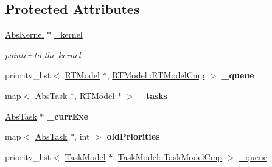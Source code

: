 \subsection*{Protected Attributes}
\begin{DoxyCompactItemize}
\item 
\hyperlink{classRTSim_1_1AbsKernel}{Abs\+Kernel} $\ast$ \hyperlink{classRTSim_1_1Scheduler_aa3fbe5bd5ca71cd567df02e6a8bfef5f}{\+\_\+kernel}\hypertarget{classRTSim_1_1Scheduler_aa3fbe5bd5ca71cd567df02e6a8bfef5f}{}\label{classRTSim_1_1Scheduler_aa3fbe5bd5ca71cd567df02e6a8bfef5f}

\begin{DoxyCompactList}\small\item\em pointer to the kernel \end{DoxyCompactList}\item 
priority\+\_\+list$<$ \hyperlink{classRTSim_1_1RTModel}{R\+T\+Model} $\ast$, \hyperlink{classRTSim_1_1RTModel_1_1RTModelCmp}{R\+T\+Model\+::\+R\+T\+Model\+Cmp} $>$ {\bfseries \+\_\+queue}\hypertarget{classRTSim_1_1Scheduler_a1cd9c1fe74eaa31e56b6f017a0e1e44d}{}\label{classRTSim_1_1Scheduler_a1cd9c1fe74eaa31e56b6f017a0e1e44d}

\item 
map$<$ \hyperlink{classRTSim_1_1AbsTask}{Abs\+Task} $\ast$, \hyperlink{classRTSim_1_1RTModel}{R\+T\+Model} $\ast$ $>$ {\bfseries \+\_\+tasks}\hypertarget{classRTSim_1_1Scheduler_abaddd7cf8b6c5c8672153ed1ae437576}{}\label{classRTSim_1_1Scheduler_abaddd7cf8b6c5c8672153ed1ae437576}

\item 
\hyperlink{classRTSim_1_1AbsTask}{Abs\+Task} $\ast$ {\bfseries \+\_\+curr\+Exe}\hypertarget{classRTSim_1_1Scheduler_a3699c088244af2deae897cd929da3729}{}\label{classRTSim_1_1Scheduler_a3699c088244af2deae897cd929da3729}

\item 
map$<$ \hyperlink{classRTSim_1_1AbsTask}{Abs\+Task} $\ast$, int $>$ {\bfseries old\+Priorities}\hypertarget{classRTSim_1_1Scheduler_aec749677c25b9c768bda1d2b2dae6a91}{}\label{classRTSim_1_1Scheduler_aec749677c25b9c768bda1d2b2dae6a91}

\item 
priority\+\_\+list$<$ \hyperlink{classRTSim_1_1TaskModel}{Task\+Model} $\ast$, \hyperlink{classRTSim_1_1TaskModel_1_1TaskModelCmp}{Task\+Model\+::\+Task\+Model\+Cmp} $>$ \hyperlink{classRTSim_1_1Scheduler_ad0cf16f7cd916dce08bbe4edfa0d8246}{\+\_\+queue}\hypertarget{classRTSim_1_1Scheduler_ad0cf16f7cd916dce08bbe4edfa0d8246}{}\label{classRTSim_1_1Scheduler_ad0cf16f7cd916dce08bbe4edfa0d8246}


\end{DoxyCompactItemize}
